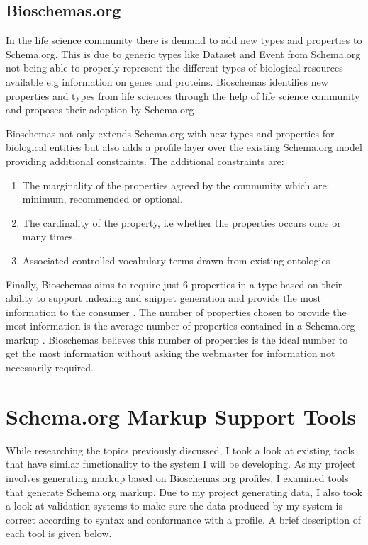 \subsection{Bioschemas.org}
\label{sec:bioschema}
In the life science community there is demand to add new types and properties to Schema.org. This is due to generic types like Dataset and Event from Schema.org not being able to properly represent the different types of biological resources available e.g information on genes and proteins. Bioschemas identifies new properties and types from life sciences through the help of life science community and proposes their adoption by Schema.org \cite{bioschemasWebsite}. 

Bioschemas not only extends Schema.org with new types and properties for biological entities but also adds a profile layer over the existing Schema.org model \cite{gray2017bioschemas} providing additional constraints. The additional constraints are:

{
\begin{enumerate}
    \item The marginality of the properties agreed by the community which are: minimum, recommended or optional. 
    \item The cardinality of the property, i.e whether the properties occurs once or many times. 
    \item Associated controlled vocabulary terms drawn from existing ontologies
\end{enumerate}
}

Finally, Bioschemas aims to require just 6 properties in a type based on their ability to support indexing and snippet generation and provide the most information to the consumer \cite{gray2017bioschemas}. The number of properties chosen to provide the most information is the average number of properties contained in a Schema.org markup \cite{guha2015schema}. Bioschemas believes this number of properties is the ideal number to get the most information without asking the webmaster for information not necessarily required. 

\section{Schema.org Markup Support Tools}
\label{sec:supportTools}
While researching the topics previously discussed, I took a look at existing tools that have similar functionality to the system I will be developing. As my project involves generating markup based on Bioschemas.org profiles, I examined tools that generate Schema.org markup. Due to my project generating data, I also took a look at validation systems to make sure the data produced by my system is correct according to syntax and conformance with a profile. A brief description of each tool is given below.

